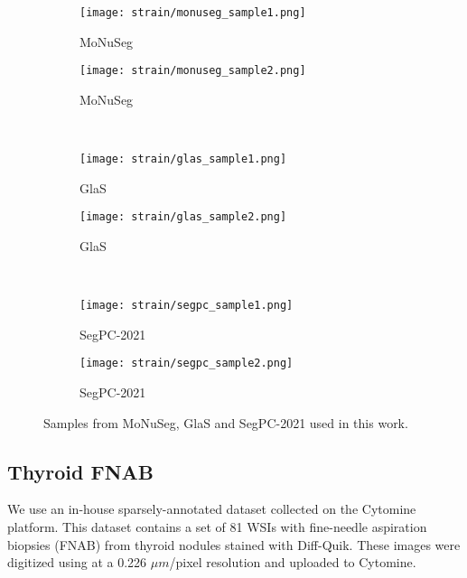 \begin{figure}
  \centering
  \begin{subfigure}{0.48\textwidth}
    \centering
    \texttt{[image: strain/monuseg\_sample1.png]}
    \caption{MoNuSeg}
    \label{sfig:strain:monuseg_sample1}
  \end{subfigure}
  \begin{subfigure}{0.48\textwidth}
    \centering
    \texttt{[image: strain/monuseg\_sample2.png]}
    \caption{MoNuSeg}
    \label{sfig:strain:monuseg_sample2}
  \end{subfigure} \\

  \begin{subfigure}{0.48\textwidth}
    \centering
    \texttt{[image: strain/glas\_sample1.png]}
    \caption{GlaS}
    \label{sfig:strain:glas_sample1}
  \end{subfigure}
  \begin{subfigure}{0.48\textwidth}
    \centering
    \texttt{[image: strain/glas\_sample2.png]}
    \caption{GlaS}
    \label{sfig:strain:glas_sample2}
  \end{subfigure} \\

  \begin{subfigure}{0.48\textwidth}
    \centering
    \texttt{[image: strain/segpc\_sample1.png]}
    \caption{SegPC-2021}
    \label{sfig:strain:segpc_sample1}
  \end{subfigure}
  \begin{subfigure}{0.48\textwidth}
    \centering
    \texttt{[image: strain/segpc\_sample2.png]}
    \caption{SegPC-2021}
    \label{sfig:strain:segpc_sample2}
  \end{subfigure} 
  
  \caption{Samples from MoNuSeg, GlaS and SegPC-2021 used in this work.}
  \label{fig:strain:datasets_samples}
\end{figure}


\subsection{Thyroid FNAB}
\label{ssec:strain:thyroidfnab}

We use an in-house sparsely-annotated dataset collected on the Cytomine platform. This dataset contains a set of 81 WSIs with fine-needle aspiration biopsies (FNAB) from thyroid nodules stained with Diff-Quik. These images were digitized using  at a 0.226 $\mu m$/pixel resolution and uploaded to Cytomine. 

